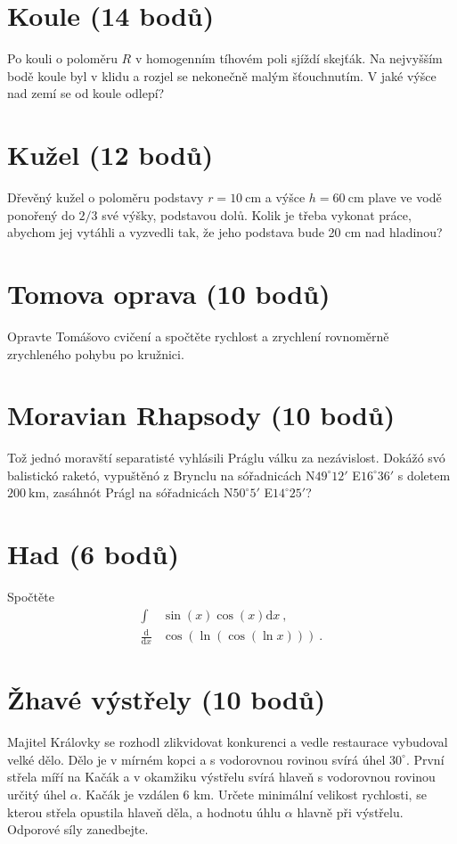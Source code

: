 \documentclass[10pt,a4paper,landscape,twocolumn]{article}
\begin{document}
\section{Koule (14 bodů)}
Po kouli o poloměru $R$ v homogenním tíhovém poli sjíždí skejťák. Na nejvyšším bodě koule byl v klidu a rozjel se nekonečně malým šťouchnutím. V jaké výšce nad zemí se od koule odlepí?

\section{Kužel (12 bodů)}
Dřevěný kužel o poloměru podstavy $r = 10~\mathrm{cm}$ a výšce $h = 60~\mathrm{cm}$ plave ve vodě ponořený do $2/3$ své výšky, podstavou dolů. Kolik je třeba vykonat práce, abychom jej vytáhli a vyzvedli tak, že jeho podstava bude 20 cm nad hladinou?

\section{Tomova oprava (10 bodů)}
Opravte Tomášovo cvičení a spočtěte rychlost a zrychlení rovnoměrně zrychleného pohybu po kružnici.

\section{Moravian Rhapsody (10 bodů)}
Tož jednó moravští separatisté vyhlásili Práglu válku za nezávislost. Dokážó svó balistickó raketó, vypuštěnó z Brynclu na sóřadnicách N$49^\circ 12'$ E$16^\circ 36'$ s doletem $200~\mathrm{km}$, zasáhnót Prágl na sóřadnicách N$50^\circ 5'$ E$14^\circ 25'$?

\section{Had (6 bodů)}
Spočtěte
\begin{subequations}
\begin{align*}
\int &\sin(x)\cos(x)\mathrm{d}x ~, \\
\frac{\mathrm{d}}{\mathrm{d}x}&\cos\left(\ln\left(\cos\left(\ln x\right)\right)\right) ~.
\end{align*}
\end{subequations}

\section{Žhavé výstřely (10 bodů)}
Majitel Královky se rozhodl zlikvidovat konkurenci a vedle restaurace vybudoval velké dělo. Dělo je v mírném kopci a s  vodorovnou rovinou svírá úhel $30^{\circ}$. První střela míří na Kačák a v okamžiku výstřelu svírá hlaveň s vodorovnou rovinou určitý úhel $\alpha$. Kačák je vzdálen 6 km. Určete minimální velikost rychlosti, se kterou střela opustila hlaveň děla, a hodnotu úhlu $\alpha$ hlavně při výstřelu. Odporové síly zanedbejte.
\end{document}

